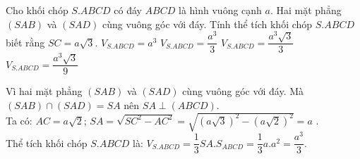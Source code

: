 \begin{ex}%
Cho khối chóp $ S.ABCD$ có đáy $ ABCD$ là hình vuông cạnh $ a$. Hai mặt phẳng $\left(SAB\right)$ và $\left(SAD\right)$ cùng vuông góc với đáy. Tính thể tích khối chóp $ S.ABCD$ biết rằng $ SC=a\sqrt{3}$.
\choice
{$V_{S.ABCD}=a^3$}
{\True $V_{S.ABCD}=\dfrac{a^3}{3}$}
{$V_{S.ABCD}=\dfrac{a^3\sqrt{3}}{3}$}
{$V_{S.ABCD}=\dfrac{a^3\sqrt{3}}{9}$}
\loigiai
{
\begin{center}
\end{center}
Vì hai mặt phẳng $\left(SAB\right)$ và $\left(SAD\right)$ cùng vuông góc với đáy. Mà $\left(SAB\right)\cap\left(SAD\right)=SA$ nên $ SA\perp\left(ABCD\right)$.\\
Ta có: $ AC=a\sqrt{2}$; $SA=\sqrt{S{C^2}-A{C^2}}=\sqrt{\left(a\sqrt{3}\right)^2-\left(a\sqrt{2}\right)^2}=a$ .\\
Thể tích khối chóp $ S.ABCD$ là: $V_{S.ABCD}=\dfrac{1}{3}SA.S_{ABCD}=\dfrac{1}{3}a.a^2=\dfrac{a^3}{3}$.}
\end{ex}


